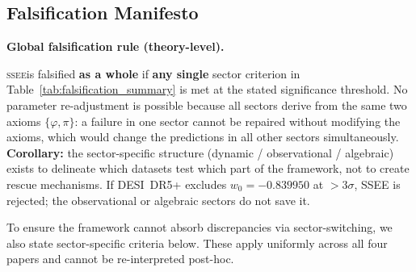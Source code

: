 \documentclass[12pt,a4paper]{article}
\newcommand{\SSEE}{\ifmmode\mathrm{SSEE}\else\textsc{ssee}\fi}
\begin{document}
\subsection{Falsification Manifesto}
\label{sec:falsification}

\noindent\textbf{Global falsification rule (theory-level).}\par\smallskip
\noindent\begin{tcolorbox}[colback=red!8,colframe=red!70!black,title=Global Falsification Criterion,width=\linewidth]
\SSEE is falsified \textbf{as a whole} if \textbf{any single} sector
criterion in Table~\ref{tab:falsification_summary} is met at the stated
significance threshold. No parameter re-adjustment is possible because
all sectors derive from the same two axioms $\{\varphi,\pi\}$: a failure
in one sector cannot be repaired without modifying the axioms, which would
change the predictions in all other sectors simultaneously.\\[4pt]
\textbf{Corollary:} the sector-specific structure (dynamic / observational /
algebraic) exists to delineate which datasets test which part of the
framework, not to create rescue mechanisms.  If DESI~DR5+ excludes
$w_0=-0.839950$ at $>3\sigma$, SSEE is rejected; the observational or
algebraic sectors do not save it.
\end{tcolorbox}

\medskip
\noindent To ensure the framework cannot absorb discrepancies via sector-switching,
we also state sector-specific criteria below. These apply uniformly across
all four papers and cannot be re-interpreted post-hoc.
\end{document}
